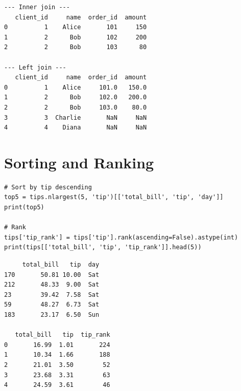 \begin{codeoutput}
\begin{verbatim}
--- Inner join ---
   client_id     name  order_id  amount
0          1    Alice       101     150
1          2      Bob       102     200
2          2      Bob       103      80

--- Left join ---
   client_id     name  order_id  amount
0          1    Alice     101.0   150.0
1          2      Bob     102.0   200.0
2          2      Bob     103.0    80.0
3          3  Charlie       NaN     NaN
4          4    Diana       NaN     NaN
\end{verbatim}
\end{codeoutput}

\begin{center}
\end{center}

\section{Sorting and Ranking}

\begin{codeblock}[title=\textbf{Python --- Sorting}]
\begin{verbatim}
# Sort by tip descending
top5 = tips.nlargest(5, 'tip')[['total_bill', 'tip', 'day']]
print(top5)

# Rank
tips['tip_rank'] = tips['tip'].rank(ascending=False).astype(int)
print(tips[['total_bill', 'tip', 'tip_rank']].head(5))
\end{verbatim}
\end{codeblock}

\begin{codeoutput}
\begin{verbatim}
     total_bill   tip  day
170       50.81 10.00  Sat
212       48.33  9.00  Sat
23        39.42  7.58  Sat
59        48.27  6.73  Sat
183       23.17  6.50  Sun

   total_bill   tip  tip_rank
0       16.99  1.01       224
1       10.34  1.66       188
2       21.01  3.50        52
3       23.68  3.31        63
4       24.59  3.61        46
\end{verbatim}
\end{codeoutput}

